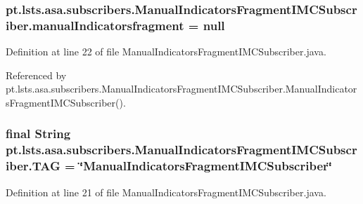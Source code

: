 \subsubsection[{manual\+Indicatorsfragment}]{ pt.\+lsts.\+asa.\+subscribers.\+Manual\+Indicators\+Fragment\+I\+M\+C\+Subscriber.\+manual\+Indicatorsfragment = null\hspace{0.3cm}{\ttfamily [private]}}\label{classpt_1_1lsts_1_1asa_1_1subscribers_1_1ManualIndicatorsFragmentIMCSubscriber_aed562c78c365b11b8c6a12fbee977aa0}


Definition at line 22 of file Manual\+Indicators\+Fragment\+I\+M\+C\+Subscriber.\+java.



Referenced by pt.\+lsts.\+asa.\+subscribers.\+Manual\+Indicators\+Fragment\+I\+M\+C\+Subscriber.\+Manual\+Indicators\+Fragment\+I\+M\+C\+Subscriber().

\hypertarget{classpt_1_1lsts_1_1asa_1_1subscribers_1_1ManualIndicatorsFragmentIMCSubscriber_a903da680d4446a05739235db44511042}{}
\subsubsection[{T\+A\+G}]{\setlength{\rightskip}{0pt plus 5cm}final String pt.\+lsts.\+asa.\+subscribers.\+Manual\+Indicators\+Fragment\+I\+M\+C\+Subscriber.\+T\+A\+G = \char`\"{}Manual\+Indicators\+Fragment\+I\+M\+C\+Subscriber\char`\"{}\hspace{0.3cm}{\ttfamily [private]}}\label{classpt_1_1lsts_1_1asa_1_1subscribers_1_1ManualIndicatorsFragmentIMCSubscriber_a903da680d4446a05739235db44511042}


Definition at line 21 of file Manual\+Indicators\+Fragment\+I\+M\+C\+Subscriber.\+java.

\hypertarget{classpt_1_1lsts_1_1asa_1_1subscribers_1_1ManualIndicatorsFragmentIMCSubscriber_ac688b3e00ef68800684d04ad43ba2fc7}{}
